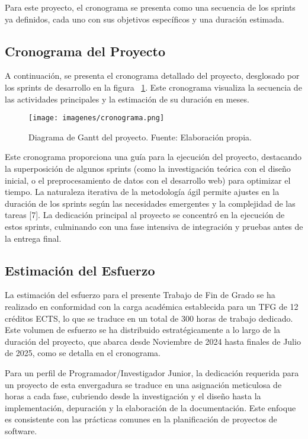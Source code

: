 Para este proyecto, el cronograma se presenta como una secuencia de los sprints ya definidos, cada uno con sus objetivos específicos y una duración estimada.

\subsection{Cronograma del Proyecto}

A continuación, se presenta el cronograma detallado del proyecto, desglosado por los sprints de desarrollo en la figura ~\ref{Fig.Cronograma}. Este cronograma visualiza la secuencia de las actividades principales y la estimación de su duración en meses.

\begin{figure}[ht!]
  \centering
  \texttt{[image: imagenes/cronograma.png]}
  \caption{Diagrama de Gantt del proyecto. Fuente: Elaboración propia.}
  \label{Fig.Cronograma}
\end{figure}


Este cronograma proporciona una guía para la ejecución del proyecto, destacando la superposición de algunos sprints (como la investigación teórica con el diseño inicial, o el preprocesamiento de datos con el desarrollo web) para optimizar el tiempo. La naturaleza iterativa de la metodología ágil permite ajustes en la duración de los sprints según las necesidades emergentes y la complejidad de las tareas [7]. La dedicación principal al proyecto se concentró en la ejecución de estos sprints, culminando con una fase intensiva de integración y pruebas antes de la entrega final.

\subsection{Estimación del Esfuerzo}

La estimación del esfuerzo para el presente Trabajo de Fin de Grado se ha realizado en conformidad con la carga académica establecida para un TFG de 12 créditos ECTS, lo que se traduce en un total de 300 horas de trabajo dedicado. Este volumen de esfuerzo se ha distribuido estratégicamente a lo largo de la duración del proyecto, que abarca desde Noviembre de 2024 hasta finales de Julio de 2025, como se detalla en el cronograma.

Para un perfil de Programador/Investigador Junior, la dedicación requerida para un proyecto de esta envergadura se traduce en una asignación meticulosa de horas a cada fase, cubriendo desde la investigación y el diseño hasta la implementación, depuración y la elaboración de la documentación. Este enfoque es consistente con las prácticas comunes en la planificación de proyectos de software.

